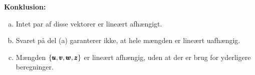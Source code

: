\begin{solution}
        \textbf{Konklusion:}
        
        \begin{enumerate}[(a)]
            \item Intet par af disse vektorer er lineært afhængigt.
            \item Svaret på del (a) garanterer ikke, at hele mængden er lineært uafhængig.
            \item Mængden $\{\pmb{u}, \pmb{v}, \pmb{w}, \pmb{z}\}$ er lineært afhængig, uden at der er brug for yderligere beregninger.
        \end{enumerate}

\end{solution}
